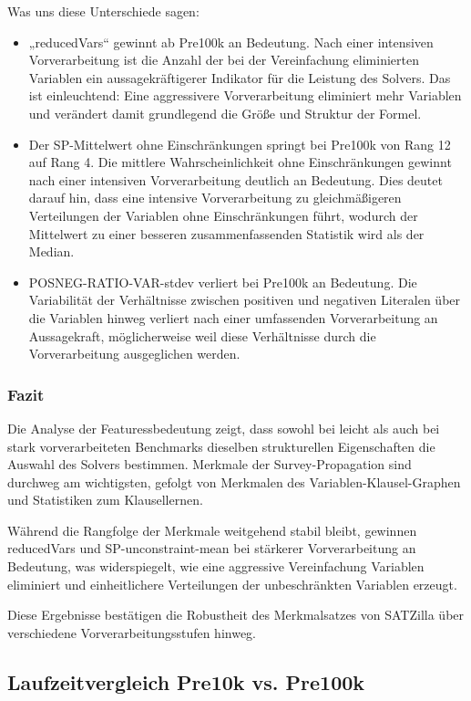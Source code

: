 Was uns diese Unterschiede sagen:
\begin{itemize}
    \item „reducedVars“ gewinnt ab Pre100k an Bedeutung. Nach einer intensiven Vorverarbeitung ist die Anzahl der bei der Vereinfachung eliminierten Variablen ein aussagekräftigerer Indikator für die Leistung des Solvers. Das ist einleuchtend: Eine aggressivere Vorverarbeitung eliminiert mehr Variablen und verändert damit grundlegend die Größe und Struktur der Formel.
    \item Der SP-Mittelwert ohne Einschränkungen springt bei Pre100k von Rang 12 auf Rang 4. Die mittlere Wahrscheinlichkeit ohne Einschränkungen gewinnt nach einer intensiven Vorverarbeitung deutlich an Bedeutung. Dies deutet darauf hin, dass eine intensive Vorverarbeitung zu gleichmäßigeren Verteilungen der Variablen ohne Einschränkungen führt, wodurch der Mittelwert zu einer besseren zusammenfassenden Statistik wird als der Median.
    \item POSNEG-RATIO-VAR-stdev verliert bei Pre100k an Bedeutung. Die Variabilität der Verhältnisse zwischen positiven und negativen Literalen über die Variablen hinweg verliert nach einer umfassenden Vorverarbeitung an Aussagekraft, möglicherweise weil diese Verhältnisse durch die Vorverarbeitung ausgeglichen werden.
\end{itemize}

\subsubsection{Fazit}

Die Analyse der Featuressbedeutung zeigt, dass sowohl bei leicht als auch bei stark vorverarbeiteten 
Benchmarks dieselben strukturellen Eigenschaften die Auswahl des Solvers bestimmen. Merkmale der 
Survey-Propagation sind durchweg am wichtigsten, gefolgt von Merkmalen des Variablen-Klausel-Graphen 
und Statistiken zum Klausellernen. 

Während die Rangfolge der Merkmale weitgehend stabil bleibt, gewinnen reducedVars und SP-unconstraint-mean 
bei stärkerer Vorverarbeitung an Bedeutung, was widerspiegelt, wie eine aggressive Vereinfachung 
Variablen eliminiert und einheitlichere Verteilungen der unbeschränkten Variablen erzeugt. 

Diese Ergebnisse bestätigen die Robustheit des Merkmalsatzes von SATZilla über verschiedene 
Vorverarbeitungsstufen hinweg.

\newpage

\subsection{Laufzeitvergleich Pre10k vs. Pre100k}

